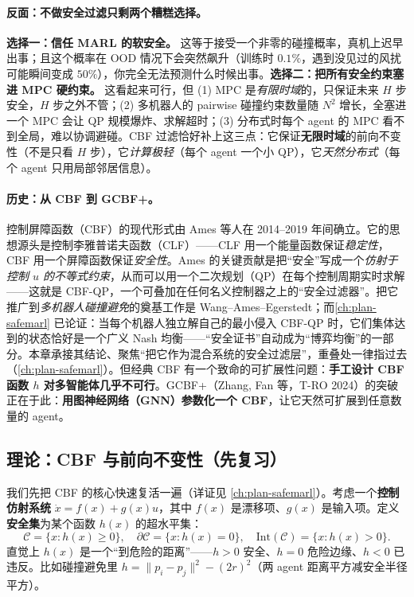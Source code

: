 \paragraph{反面：不做安全过滤只剩两个糟糕选择。}
\textbf{选择一：信任 MARL 的软安全。} 这等于接受一个非零的碰撞概率，真机上迟早出事；且这个概率在 OOD 情况下会突然飙升（训练时 $0.1\%$，遇到没见过的风扰可能瞬间变成 $50\%$），你完全无法预测什么时候出事。\textbf{选择二：把所有安全约束塞进 MPC 硬约束。} 这看起来可行，但 (1) MPC 是\emph{有限时域}的，只保证未来 $H$ 步安全，$H$ 步之外不管；(2) 多机器人的 pairwise 碰撞约束数量随 $N^2$ 增长，全塞进一个 MPC 会让 QP 规模爆炸、求解超时；(3) 分布式时每个 agent 的 MPC 看不到全局，难以协调避碰。CBF 过滤恰好补上这三点：它保证\textbf{无限时域}的前向不变性（不是只看 $H$ 步），它\emph{计算极轻}（每个 agent 一个小 QP），它\emph{天然分布式}（每个 agent 只用局部邻居信息）。

\paragraph{历史：从 CBF 到 GCBF+。}
控制屏障函数（CBF）的现代形式由 Ames 等人在 2014--2019 年间确立\cite{ames2017cbf,ames2019cbf}。它的思想源头是控制李雅普诺夫函数（CLF）——CLF 用一个能量函数保证\emph{稳定性}，CBF 用一个屏障函数保证\emph{安全性}。Ames 的关键贡献是把“安全”写成一个\emph{仿射于控制 $u$ 的不等式约束}，从而可以用一个二次规划（QP）在每个控制周期实时求解——这就是 CBF-QP，一个可叠加在任何名义控制器之上的“安全过滤器”。把它推广到\emph{多机器人碰撞避免}的奠基工作是 Wang--Ames--Egerstedt\cite{wang2017safety}；而\cref{ch:plan-safemarl} 已论证：当每个机器人独立解自己的最小侵入 CBF-QP 时，它们集体达到的状态恰好是一个广义 Nash 均衡——“安全证书”自动成为“博弈均衡”的一部分。本章承接其结论、聚焦“把它作为混合系统的安全过滤层”，重叠处一律指过去（\cref{ch:plan-safemarl}）。但经典 CBF 有一个致命的可扩展性问题：\textbf{手工设计 CBF 函数 $h$ 对多智能体几乎不可行}。GCBF+\cite{zhang2025gcbfplus}（Zhang, Fan 等，T-RO 2024）的突破正在于此：\textbf{用图神经网络（GNN）参数化一个 CBF}，让它天然可扩展到任意数量的 agent。

\subsection{理论：CBF 与前向不变性（先复习）}
\label{sec:mh-cbf-recall}

我们先把 CBF 的核心快速复活一遍（详证见 \cref{ch:plan-safemarl}）。考虑一个\textbf{控制仿射系统} $\dot x=f(x)+g(x)u$，其中 $f(x)$ 是漂移项、$g(x)$ 是输入项。定义\textbf{安全集}为某个函数 $h(x)$ 的超水平集：
\begin{equation}
  \mathcal{C}=\{x:h(x)\ge0\},\quad \partial\mathcal{C}=\{x:h(x)=0\},\quad \mathrm{Int}(\mathcal{C})=\{x:h(x)>0\}.
  \label{eq:mh-safe-set}
\end{equation}
直觉上 $h(x)$ 是一个“到危险的距离”——$h>0$ 安全、$h=0$ 危险边缘、$h<0$ 已违反。比如碰撞避免里 $h=\|p_i-p_j\|^2-(2r)^2$（两 agent 距离平方减安全半径平方）。

